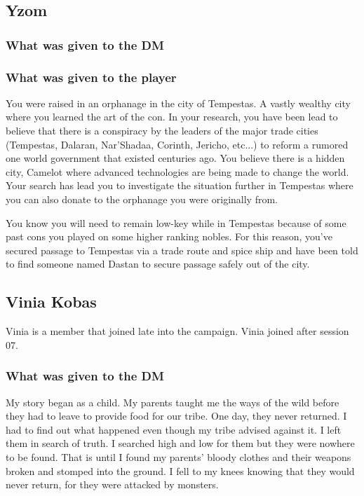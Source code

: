 \subsection{Yzom}

\subsubsection{What was given to the DM}

\subsubsection{What was given to the player}

You were raised in an orphanage in the city of Tempestas. A vastly wealthy city where you learned the art of the con. In your research, you have been lead to believe that there is a conspiracy by the leaders of the major trade cities (Tempestas, Dalaran, Nar'Shadaa, Corinth, Jericho, etc...) to reform a rumored one world government that existed centuries ago. You believe there is a hidden city, Camelot where advanced technologies are being made to change the world. Your search has lead you to investigate the situation further in Tempestas where you can also donate to the orphanage you were originally from. 

You know you will need to remain low-key while in Tempestas because of some past cons you played on some higher ranking nobles. For this reason, you've secured passage to Tempestas via a trade route and spice ship and have been told to find someone named Dastan to secure passage safely out of the city. 

\subsection{Vinia Kobas}

Vinia is a member that joined late into the campaign. Vinia joined after session 07.

\subsubsection{What was given to the DM}

My story began as a child. My parents taught me the ways of the wild before they had to leave to provide food for our tribe. One day, they never returned. I had to find out what happened even though my tribe advised against it. I left them in search of truth. I searched high and low for them but they were nowhere to be found. That is until I found my parents’ bloody clothes and their weapons broken and stomped into the ground. I fell to my knees knowing that they would never return, for they were attacked by monsters. 
	
